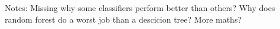 Notes:
Missing why some classifiers perform better than others?
Why does random forest do a worst job than a descicion tree?
More maths?